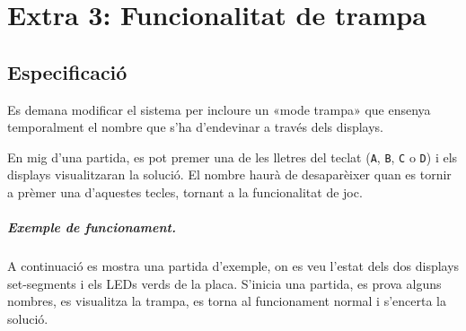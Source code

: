 \chapter{Extra 3: Funcionalitat de trampa}

\section{Especificació}

Es demana modificar el sistema per incloure un «mode trampa» que ensenya temporalment el nombre que s'ha d'endevinar a través dels displays.

En mig d'una partida, es pot premer una de les lletres del teclat (\texttt{A}, \texttt{B}, \texttt{C} o \texttt{D}) i els displays visualitzaran
la solució. El nombre haurà de desaparèixer quan es tornir a prèmer una d'aquestes tecles, tornant a la funcionalitat de joc.

\paragraph{Exemple de funcionament.}

A continuació es mostra una partida d'exemple, on es veu l'estat dels dos displays
set-segments i els LEDs verds de la placa. S'inicia una partida, es prova alguns nombres,
es visualitza la trampa, es torna al funcionament normal i s'encerta la solució.

